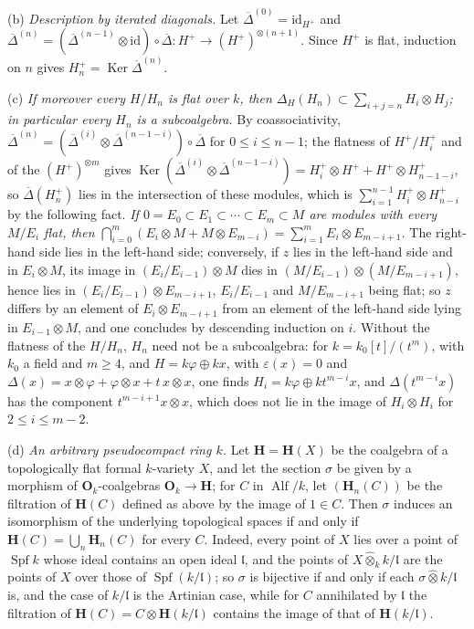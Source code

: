 (b) \emph{Description by iterated diagonals.} Let \(\overline\Delta^{(0)}=\mathrm{id}_{H^+}\) and
\(\overline\Delta^{(n)}=(\overline\Delta^{(n-1)}\otimes\mathrm{id})\circ\overline\Delta\colon H^+\to
(H^+)^{\otimes(n+1)}\). Since \(H^+\) is flat, induction on \(n\) gives
\(H_n^+=\operatorname{Ker}\overline\Delta^{(n)}\).

(c) \emph{If moreover every \(H/H_n\) is flat over \(k\), then
\(\Delta_H(H_n)\subset\sum_{i+j=n}H_i\otimes H_j\); in particular every \(H_n\) is a subcoalgebra.} By
coassociativity, \(\overline\Delta^{(n)}=(\overline\Delta^{(i)}\otimes\overline\Delta^{(n-1-i)})
\circ\overline\Delta\) for \(0\le i\le n-1\); the flatness of \(H^+/H_i^+\) and of the
\((H^+)^{\otimes m}\) gives \(\operatorname{Ker}(\overline\Delta^{(i)}\otimes\overline\Delta^{(n-1-i)})
=H_i^+\otimes H^++H^+\otimes H_{n-1-i}^+\), so \(\overline\Delta(H_n^+)\) lies in the intersection of
these modules, which is \(\sum_{i=1}^{n-1}H_i^+\otimes H_{n-i}^+\) by the following fact. \emph{If
\(0=E_0\subset E_1\subset\cdots\subset E_m\subset M\) are modules with every \(M/E_i\) flat, then
\(\bigcap_{i=0}^m(E_i\otimes M+M\otimes E_{m-i})=\sum_{i=1}^mE_i\otimes E_{m-i+1}\).} The right-hand
side lies in the left-hand side; conversely, if \(z\) lies in the left-hand side and in
\(E_i\otimes M\), its image in \((E_i/E_{i-1})\otimes M\) dies in
\((M/E_{i-1})\otimes(M/E_{m-i+1})\), hence lies in \((E_i/E_{i-1})\otimes E_{m-i+1}\), \(E_i/E_{i-1}\)
and \(M/E_{m-i+1}\) being flat; so \(z\) differs by an element of \(E_i\otimes E_{m-i+1}\) from an element
of the left-hand side lying in \(E_{i-1}\otimes M\), and one concludes by descending induction on \(i\).
Without the flatness of the \(H/H_n\), \(H_n\) need not be a subcoalgebra: for
\(k=k_0[t]/(t^m)\), with \(k_0\) a field and \(m\ge4\), and \(H=k\varphi\oplus kx\), with \(\varepsilon(x)=0\) and
\(\Delta(x)=x\otimes\varphi+\varphi\otimes x+t\,x\otimes x\), one finds
\(H_i=k\varphi\oplus kt^{m-i}x\), and \(\Delta(t^{m-i}x)\) has the component \(t^{m-i+1}x\otimes x\),
which does not lie in the image of \(H_i\otimes H_i\) for \(2\le i\le m-2\).

(d) \emph{An arbitrary pseudocompact ring \(k\).} Let \(\mathbf H=\mathbf H(X)\) be the coalgebra of a
topologically flat formal \(k\)-variety \(X\), and let the section \(\sigma\) be given by a morphism of
\(\mathbf O_k\)-coalgebras \(\mathbf O_k\to\mathbf H\); for \(C\) in \(\operatorname{Alf}/k\), let
\((\mathbf H_n(C))\) be the filtration of \(\mathbf H(C)\) defined as above by the image of \(1\in C\).
Then \(\sigma\) induces an isomorphism
of the underlying topological spaces if and only if \(\mathbf H(C)=\bigcup_n\mathbf H_n(C)\) for every
\(C\). Indeed, every point of \(X\) lies over a point of \(\operatorname{Spf}k\) whose ideal contains an
open ideal \(\mathfrak l\), and the points of \(X\widehat\otimes_kk/\mathfrak l\) are the points of \(X\)
over those of \(\operatorname{Spf}(k/\mathfrak l)\); so \(\sigma\) is bijective if and only if each
\(\sigma\widehat\otimes k/\mathfrak l\) is, and the case of \(k/\mathfrak l\) is the Artinian case, while
for \(C\) annihilated by \(\mathfrak l\) the filtration of \(\mathbf H(C)=C\otimes\mathbf H(k/\mathfrak l)\)
contains the image of that of \(\mathbf H(k/\mathfrak l)\).

